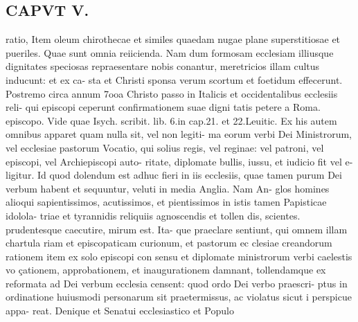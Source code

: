 \documentclass{article}
\begin{document}
\begin{pages}
\section*{CAPVT  V. }
\marginpar{[ p.363 ]}\pstart ratio, Item oleum chirothecae et similes quaedam nugae plane superstitiosae et pueriles. Quae sunt omnia reiicienda. Nam dum formosam ecclesiam illiusque dignitates speciosas repraesentare nobis conantur, meretricios illam cultus inducunt: et ex ca- sta et Christi sponsa verum scortum et foetidum effecerunt. Postremo circa annum 7ooa Christo passo in Italicis et occidentalibus ecclesiis reli- qui episcopi ceperunt confirmationem suae digni tatis petere a Roma. episcopo. Vide quae Isych. scribit. lib. 6.in cap.21. et 22.Leuitic. Ex his autem omnibus apparet quam nulla sit, vel non legiti- ma eorum verbi Dei Ministrorum, vel ecclesiae pastorum Vocatio, qui solius regis, vel reginae: vel patroni, vel episcopi, vel Archiepiscopi auto- ritate, diplomate bullis, iussu, et iudicio fit vel e- ligitur. Id quod dolendum est adhuc fieri in iis ecclesiis, quae tamen purum Dei verbum habent et sequuntur, veluti in media Anglia. Nam An- glos homines alioqui sapientissimos, acutissimos, et pientissimos in istis tamen Papisticae idolola- triae et tyrannidis reliquiis agnoscendis et tollen dis, scientes. prudentesque caecutire, mirum est. Ita- que praeclare sentiunt, qui omnem illam chartula riam et episcopaticam curionum, et pastorum ec clesiae creandorum rationem item ex solo episcopi con sensu et diplomate ministrorum verbi caelestis vo çationem, approbationem, et inaugurationem damnant, tollendamque ex reformata ad Dei verbum ecclesia censent: quod ordo Dei verbo praescri- ptus in ordinatione huiusmodi personarum sit praetermissus, ac violatus sicut i perspicue appa- reat. Denique et Senatui ecclesiastico et Populo  \pend

\end{pages}
\end{document}
